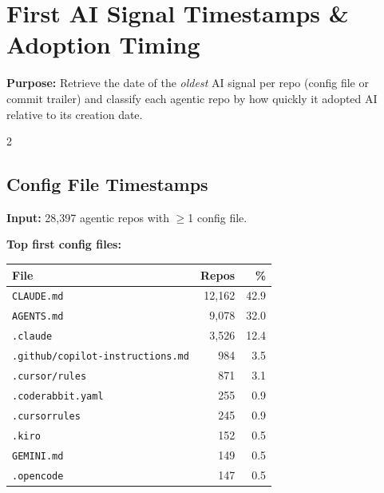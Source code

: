 \documentclass[10pt,a4paper]{article}
\begin{document}
\section*{First AI Signal Timestamps \& Adoption Timing}

\textbf{Purpose:} Retrieve the date of the \emph{oldest} AI signal per repo (config file or commit trailer)
and classify each agentic repo by how quickly it adopted AI relative to its creation date.

\vspace{6pt}
\begin{multicols}{2}
\footnotesize

\subsection*{Config File Timestamps}
\textbf{Input:} 28,397 agentic repos with $\geq$1 config file.\\


\vspace{3pt}

\textbf{Top first config files:}

\vspace{2pt}
\begin{tabular}{@{}lrr@{}}
\toprule
File & Repos & \% \\
\midrule
\texttt{CLAUDE.md}                       & 12,162 & 42.9 \\
\texttt{AGENTS.md}                       &  9,078 & 32.0 \\
\texttt{.claude}                         &  3,526 & 12.4 \\
\texttt{.github/copilot-instructions.md} &    984 &  3.5 \\
\texttt{.cursor/rules}                   &    871 &  3.1 \\
\texttt{.coderabbit.yaml}                &    255 &  0.9 \\
\texttt{.cursorrules}                    &    245 &  0.9 \\
\texttt{.kiro}                           &    152 &  0.5 \\
\texttt{GEMINI.md}                       &    149 &  0.5 \\
\texttt{.opencode}                       &    147 &  0.5 \\
\bottomrule
\end{tabular}

\vspace{4pt}



\end{multicols}
\end{document}
